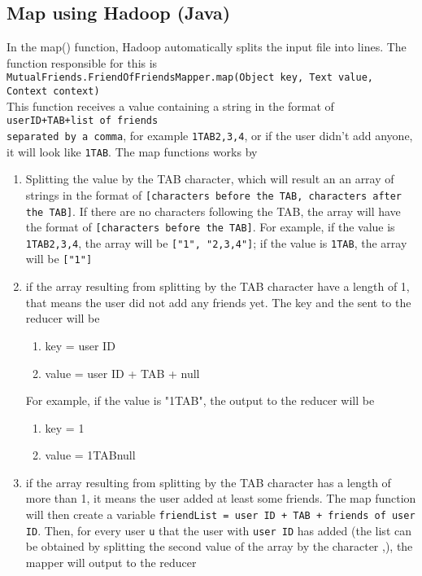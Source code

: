 \documentclass[11pt]{article}
\begin{document}
\begin{justifying}
\section{Map using Hadoop (Java)}
In the map() function, Hadoop automatically splits the input file into lines. The function responsible for this is \\ \verb|MutualFriends.FriendOfFriendsMapper.map(Object key, Text value, Context context)|
\\ This function receives a value containing a string in the format of \verb|userID+TAB+list of friends|\\\verb|separated by a comma|, for example \verb|1TAB2,3,4|, or if the user didn't add anyone, it will look like \verb|1TAB|. The map functions works by 
\begin{enumerate}
    \item Splitting the value by the TAB character, which will result an an array of strings in the format of \verb|[characters before the TAB, characters after the TAB]|. If there are no characters following the TAB, the array will have the format of  \verb|[characters before the TAB]|. For example, if the value is \verb|1TAB2,3,4|, the array will be \verb|["1", "2,3,4"]|; if the value is \verb|1TAB|, the array will be \verb|["1"]|
    \item if the array resulting from splitting by the TAB character have a length of 1, that means the user did not add any friends yet. The key and the sent to the reducer will be
    \begin{enumerate}
        \item key \space\space  = user ID
        \item value             = user ID + TAB + null
    \end{enumerate}
    For example, if the value is "1TAB", the output to the reducer will be
    \begin{enumerate}
        \item key \space\space  = 1
        \item value             = 1TABnull
    \end{enumerate}
    \item if the array resulting from splitting by the TAB character has a length of more than 1, it means the user added at least some friends. The map function will then create a variable  \verb|friendList = user ID + TAB + friends of user ID|. Then, for every user \verb|u| that the user with \verb|user ID| has added (the list can be obtained by splitting the second value of the array by the character ,), the mapper will output to the reducer

\end{enumerate}
\end{justifying}
\end{document}
